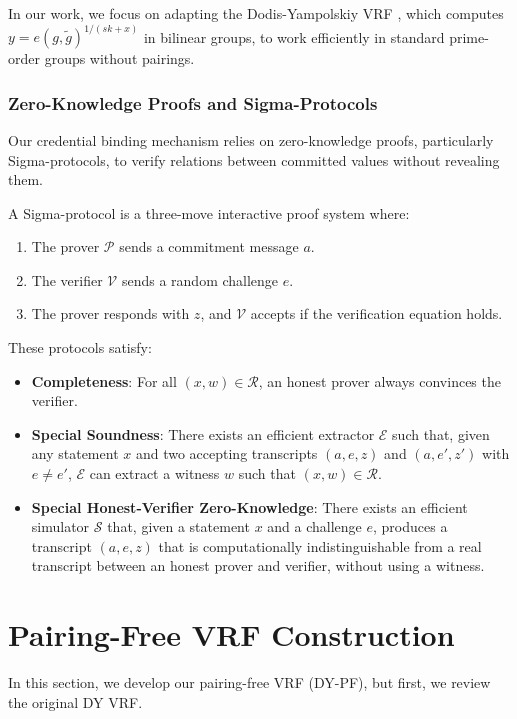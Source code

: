     
In our work, we focus on adapting the Dodis-Yampolskiy VRF \cite{hutchison_verifiable_2005}, which computes $y = e(g, \tilde{g})^{1/(sk+x)}$ in bilinear groups, to work efficiently in standard prime-order groups without pairings.

\subsubsection{Zero-Knowledge Proofs and Sigma-Protocols}
Our credential binding mechanism relies on zero-knowledge proofs, particularly Sigma-protocols, to verify relations between committed values without revealing them.

A Sigma-protocol is a three-move interactive proof system where:
\begin{enumerate}
    \item The prover $\mathcal{P}$ sends a commitment message $a$.
    \item The verifier $\mathcal{V}$ sends a random challenge $e$.
    \item The prover responds with $z$, and $\mathcal{V}$ accepts if the verification equation holds.
\end{enumerate}
These protocols satisfy:
\begin{itemize}
    \item \textbf{Completeness}: For all $(x,w) \in \mathcal{R}$, an honest prover always convinces the verifier.
    \item \textbf{Special Soundness}: There exists an efficient extractor $\mathcal{E}$ such that, given any statement $x$ and two accepting transcripts $(a,e,z)$ and $(a,e',z')$ with $e \neq e'$, $\mathcal{E}$ can extract a witness $w$ such that $(x,w) \in \mathcal{R}$.
    \item \textbf{Special Honest-Verifier Zero-Knowledge}: There exists an efficient simulator $\mathcal{S}$ that, given a statement $x$ and a challenge $e$, produces a transcript $(a,e,z)$ that is computationally indistinguishable from a real transcript between an honest prover and verifier, without using a witness.
\end{itemize}










\section{Pairing-Free VRF Construction}\label{sec:pairing-free-vrf}
In this section, we develop our pairing-free VRF (DY-PF), but first, we review the original DY VRF.

